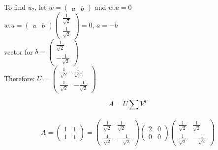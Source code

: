 \documentclass[12pt, oneside]{article}   	%
\begin{document}
\begin{enumerate}
	To find $u_2$, let $w=\left( \begin{array}{cc} a&b  \end{array} \right)$ and $w.u=0$\\
	
	$w.u=\left( \begin{array}{cc} a&b  \end{array} \right)\left( \begin{array}{c}  \frac{1}{\sqrt{2}} \\  \frac{1}{\sqrt{2}} \end{array} \right)=0$,
	$a=-b$\\
	vector for $b=\left( \begin{array}{c}  \frac{1}{\sqrt{2}} \\  - \frac{1}{\sqrt{2}} \end{array} \right)$ \\
	
	Therefore:
	$U= \left( \begin{array}{cc}  \frac{1}{\sqrt{2}} & \frac{1}{\sqrt{2}} \\  \frac{1}{\sqrt{2}}& - \frac{1}{\sqrt{2}} \end{array} \right)$
	
	$$A=U\sum V^T$$\\
	
	$$A= \left( \begin{array}{cc} 1 & 1 \\ 1 & 1  \end{array} \right)= \left( \begin{array}{cc}  \frac{1}{\sqrt{2}} & \frac{1}{\sqrt{2}} \\  \frac{1}{\sqrt{2}} & - \frac{1}{\sqrt{2}} \end{array} \right) \left( \begin{array}{cc} 2 & 0 \\ 0 & 0 \end{array} \right) \left( \begin{array}{cc} \frac{1}{\sqrt{2}} & \frac{1}{\sqrt{2}} \\ \frac{1}{\sqrt{2}} & -\frac{1}{\sqrt{2}}  \end{array} \right)$$\\
	

\end{enumerate}
\end{document}
